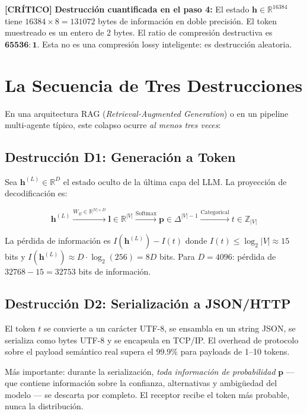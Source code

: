 \textbf{[CRÍTICO]} 
\textbf{Destrucción cuantificada en el paso 4:}
El estado $\mathbf{h} \in \mathbb{R}^{16384}$ tiene $16384 \times 8 = 131072$ bytes
de información en doble precisión. El token muestreado es un entero de 2 bytes.
El ratio de compresión destructiva es $\mathbf{65536:1}$.
Esta no es una compresión lossy inteligente: es destrucción aleatoria.


\section{La Secuencia de Tres Destrucciones}

En una arquitectura RAG (\textit{Retrieval-Augmented Generation}) o en un
pipeline multi-agente típico, este colapso ocurre \textit{al menos tres veces}:

\subsection{Destrucción D1: Generación a Token}

Sea $\mathbf{h}^{(L)} \in \mathbb{R}^D$ el estado oculto de la última capa del LLM.
La proyección de decodificación es:

\begin{equation}
\mathbf{h}^{(L)} \xrightarrow{W_E \in \mathbb{R}^{|V| \times D}} \mathbf{l} \in \mathbb{R}^{|V|}
\xrightarrow{\text{Softmax}} \mathbf{p} \in \Delta^{|V|-1}
\xrightarrow{\text{Categorical}} t \in \mathbb{Z}_{|V|}

\end{equation}

La pérdida de información es $I(\mathbf{h}^{(L)}) - I(t)$ donde
$I(t) \le \log_2 |V| \approx 15$ bits y $I(\mathbf{h}^{(L)}) \approx D \cdot \log_2(256) = 8D$ bits.
Para $D = 4096$: pérdida de $32768 - 15 = 32753$ bits de información.

\subsection{Destrucción D2: Serialización a JSON/HTTP}

El token $t$ se convierte a un carácter UTF-8, se ensambla en un string JSON,
se serializa como bytes UTF-8 y se encapsula en TCP/IP. El overhead de protocolo
sobre el payload semántico real supera el $99.9\%$ para payloads de 1--10 tokens.

Más importante: durante la serialización, \textit{toda información de probabilidad}
$\mathbf{p}$ --- que contiene información sobre la confianza, alternativas y
ambigüedad del modelo --- se descarta por completo. El receptor recibe el token
más probable, nunca la distribución.


